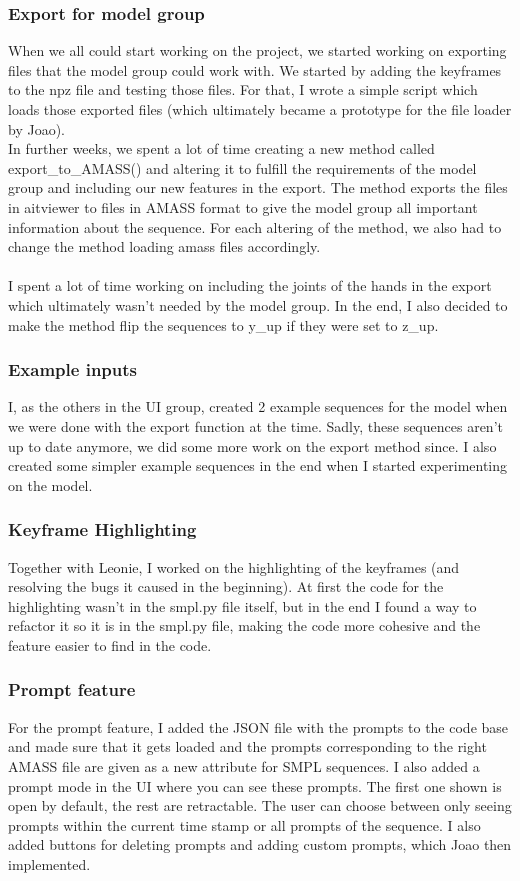 \documentclass[a4paper]{scrartcl}
\begin{document}
\subsubsection*{Export for model group}
When we all could start working on the project, we started working on exporting files that the model group could work with. We started by adding the keyframes to the npz file and testing those files. For that, I wrote a simple script which loads those exported files (which ultimately became a prototype for the file loader by Joao).\\
In further weeks, we spent a lot of time creating a new method called export\_to\_AMASS() and altering it to fulfill the requirements of the model group and including our new features in the export. The method exports the files in aitviewer to files in AMASS format to give the model group all important information about the sequence. For each altering of the method, we also had to change the method loading amass files accordingly.\\\\
I spent a lot of time working on including the joints of the hands in the export which ultimately wasn't needed by the model group. In the end, I also decided to make the method flip the sequences to y\_up if they were set to z\_up.

\subsubsection*{Example inputs}
I, as the others in the UI group, created 2 example sequences for the model when we were done with the export function at the time. Sadly, these sequences aren't up to date anymore, we did some more work on the export method since. I also created some simpler example sequences in the end when I started experimenting on the model.

\subsubsection*{Keyframe Highlighting}
Together with Leonie, I worked on the highlighting of the keyframes (and resolving the bugs it caused in the beginning). At first the code for the highlighting wasn't in the smpl.py file itself, but in the end I found a way to refactor it so it is in the smpl.py file, making the code more cohesive and the feature easier to find in the code.

\subsubsection*{Prompt feature}
For the prompt feature, I added the JSON file with the prompts to the code base and made sure that it gets loaded and the prompts corresponding to the right AMASS file are given as a new attribute for SMPL sequences. I also added a prompt mode in the UI where you can see these prompts. The first one shown is open by default, the rest are retractable. The user can choose between only seeing prompts within the current time stamp or all prompts of the sequence. I also added buttons for deleting prompts and adding custom prompts, which Joao then implemented.
\end{document}
